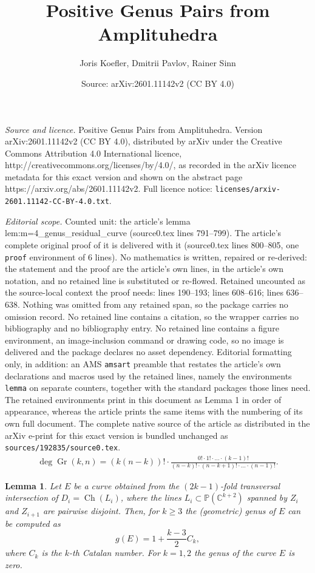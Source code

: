 \documentclass[10pt,a4paper]{amsart}
\title{Positive Genus Pairs from Amplituhedra}
\author{Joris Koefler, Dmitrii Pavlov, Rainer Sinn}
\date{Source: arXiv:2601.11142v2 (CC BY 4.0)}
\newtheorem{lemma}{Lemma}
\newcommand{\C}{\mathbb{C}}
\newcommand{\CH}{\operatorname{Ch}}
\newcommand{\PP}{\mathbb{P}}
\newcommand{\aA}{\mathcal{A}}
\DeclareMathOperator{\gr}{Gr}
\begin{document}
\maketitle

\noindent\emph{Source and licence.} Positive Genus Pairs from Amplituhedra. Version arXiv:2601.11142v2 (CC BY 4.0), distributed by arXiv under the Creative Commons Attribution 4.0 International licence, http://creativecommons.org/licenses/by/4.0/, as recorded in the arXiv licence metadata for this exact version and shown on the abstract page https://arxiv.org/abs/2601.11142v2. Full licence notice: \texttt{licenses/arxiv-2601.11142-CC-BY-4.0.txt}.\par\smallskip

\noindent\textit{Editorial scope.} Counted unit: the article's lemma lem:m=4\_genus\_residual\_curve (source0.tex lines 791--799). The article's complete original proof of it is delivered with it (source0.tex lines 800--805, one \texttt{proof} environment of 6 lines). No mathematics is written, repaired or re-derived: the statement and the proof are the article's own lines, in the article's own notation, and no retained line is substituted or re-flowed.  Retained uncounted as the source-local context the proof needs: lines 190--193; lines 608--616; lines 636--638.  Nothing was omitted from any retained span, so the package carries no omission record.  No retained line contains a citation, so the wrapper carries no bibliography and no bibliography entry.  No retained line contains a figure environment, an image-inclusion command or drawing code, so no image is delivered and the package declares no asset dependency.  Editorial formatting only, in addition: an AMS \texttt{amsart} preamble that restates the article's own declarations and macros used by the retained lines, namely the environments \texttt{lemma} on separate counters, together with the standard packages those lines need.  The retained environments print in this document as Lemma 1 in order of appearance, whereas the article prints the same items with the numbering of its own full document.  The complete native source of the article as distributed in the arXiv e-print for this exact version is bundled unchanged as \texttt{sources/192835/source0.tex}.
\begin{align}\label{eq:Grkn_deg}
    \deg\gr(k,n)=(k(n-k))! \cdot 
        \frac{0! \cdot 1! \cdot \ldots \cdot (k-1)!}{(n-k)! \cdot (n-k+1)! \cdot \ldots \cdot (n-1)!}.
\end{align}

\begin{lemma}\label{lem:genus_residual_curve}
    Let $E$ be a curve obtained from the $(2k-1)$-fold transversal intersection of $D_i=\CH(L_i)$, where the lines $L_i\subset \PP(\C^{k+2})$ spanned by $Z_i$ and $Z_{i+1}$ are pairwise disjoint.
    Then, for $k\geq 3$ the (geometric) genus of $E$  can be computed as 
    \[
    g(E)=1+\frac{k-3}{2}C_k,
    \]
    where $C_k$ is the $k$-th Catalan number. For $k=1,2$ the genus of the curve $E$ is zero.
\end{lemma}
\end{document}
